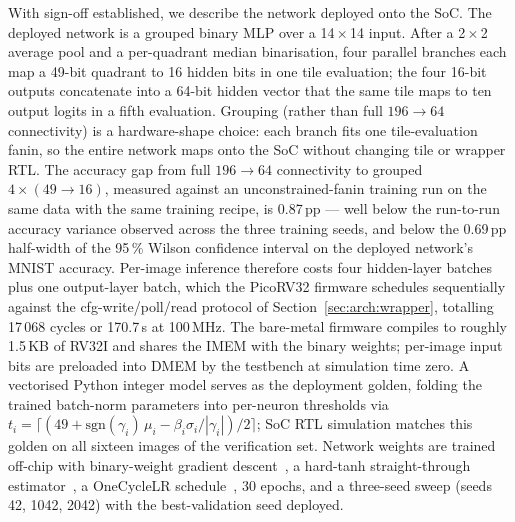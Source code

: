 \documentclass[conference]{IEEEtran}
\begin{document}
With sign-off established, we describe the network deployed onto
the SoC. The deployed network is a grouped binary MLP over a
14\,\(\times\)\,14 input. After a 2\,\(\times\)\,2 average pool and a
per-quadrant median binarisation, four parallel branches each map a
49-bit quadrant to 16 hidden bits in one tile evaluation; the four
16-bit outputs concatenate into a 64-bit hidden vector that the same
tile maps to ten output logits in a fifth evaluation. Grouping
(rather than full $196 \to 64$ connectivity) is a hardware-shape
choice: each branch fits one tile-evaluation fanin, so the entire
network maps onto the SoC without changing tile or wrapper RTL.
The accuracy gap from full $196 \to 64$ connectivity to grouped
$4 \times (49 \to 16)$, measured against an unconstrained-fanin
training run on the same data with the same training recipe, is
0.87\,pp --- well below the run-to-run accuracy variance observed
across the three training seeds, and below the 0.69\,pp half-width
of the 95\,\% Wilson confidence interval on the deployed network's
MNIST accuracy.
Per-image inference therefore costs four hidden-layer batches plus
one output-layer batch, which the PicoRV32 firmware schedules
sequentially against the cfg-write/poll/read protocol of
Section~\ref{sec:arch:wrapper}, totalling 17\,068 cycles or
170.7\,\textmu s at 100\,MHz. The bare-metal firmware compiles to
roughly 1.5\,KB of RV32I and shares the IMEM with the binary weights;
per-image input bits are preloaded into DMEM by the testbench at
simulation time zero. A vectorised Python integer model serves as
the deployment golden, folding the trained batch-norm parameters into
per-neuron thresholds via
$t_i = \lceil (49 + \mathrm{sgn}(\gamma_i)\,\mu_i - \beta_i\sigma_i/|\gamma_i|)/2 \rceil$;
SoC RTL simulation matches this golden on all sixteen images of the
verification set. Network weights are trained off-chip with binary-weight
gradient descent~\cite{binaryconnect}, a hard-tanh
straight-through estimator~\cite{hubara_bnn}, a OneCycleLR
schedule~\cite{onecycle}, 30 epochs, and a three-seed sweep (seeds
42, 1042, 2042) with the best-validation seed deployed.

\end{document}
